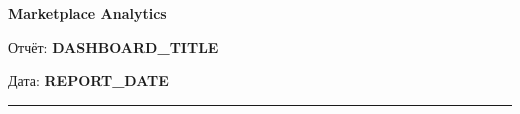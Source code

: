 \documentclass[a4paper]{article}
\begin{document}
\begin{center}
    {\LARGE\bfseries Marketplace Analytics}

    \vspace{5mm}
    {\Large Отчёт: \textbf{DASHBOARD_TITLE}}

    \vspace{3mm}
    {\normals Дата: \textbf{REPORT_DATE}}
\end{center}

\vspace{5mm}
\hrule
\vspace{5mm}

\end{document}
